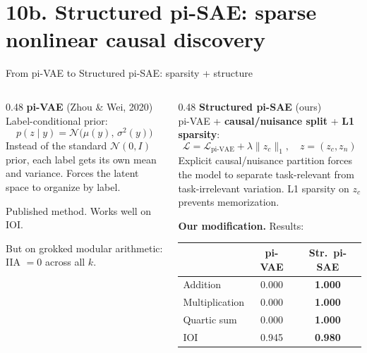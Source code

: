 \documentclass[aspectratio=169,11pt]{beamer}
\newcommand{\IIA}{\mathrm{IIA}}
\begin{document}
\hypertarget{sec10b}{}
\section{10b. Structured pi-SAE: sparse nonlinear causal discovery}

\begin{frame}{From pi-VAE to Structured pi-SAE: sparsity + structure}

\begin{columns}[T]
\begin{column}{0.48\textwidth}
\textbf{pi-VAE} {\small (Zhou \& Wei, 2020)}\\[0.3em]
{\small Label-conditional prior:}
\vspace{-0.2em}
\[ p(z \mid y) = \mathcal{N}\!\bigl(\mu(y),\, \sigma^2(y)\bigr) \]
\vspace{-0.5em}
{\small Instead of the standard $\mathcal{N}(0, I)$ prior, each label gets its own mean and variance. Forces the latent space to organize by label.}

\vspace{0.5em}
{\small Published method. Works well on IOI.}

\vspace{0.3em}
{\small But on grokked modular arithmetic:\\IIA $= 0$ across all $k$.}

\end{column}
\begin{column}{0.48\textwidth}
\textbf{Structured pi-SAE} {\small \textcolor{vae}{(ours)}}\\[0.3em]
{\small pi-VAE + \textbf{causal/nuisance split} + \textbf{L1 sparsity}:}
\vspace{-0.2em}
\[ \mathcal{L} = \mathcal{L}_\text{pi-VAE} + \lambda \|z_c\|_1, \quad z = (z_c, z_n) \]
\vspace{-0.5em}
{\small Explicit causal/nuisance partition forces the model to separate task-relevant from task-irrelevant variation. L1 sparsity on $z_c$ prevents memorization.}

\vspace{0.5em}
{\small \textbf{Our modification.} Results:}

\vspace{0.3em}
\begin{tabular}{@{}lcc@{}}
& \textbf{pi-VAE} & \textbf{Str.\ pi-SAE} \\
\midrule
{\small Addition} & 0.000 & \textbf{\textcolor{always}{1.000}} \\
{\small Multiplication} & 0.000 & \textbf{\textcolor{always}{1.000}} \\
{\small Quartic sum} & 0.000 & \textbf{\textcolor{always}{1.000}} \\
{\small IOI} & 0.945 & \textbf{\textcolor{always}{0.980}} \\
\end{tabular}


\end{column}
\end{columns}
\end{frame}
\end{document}
